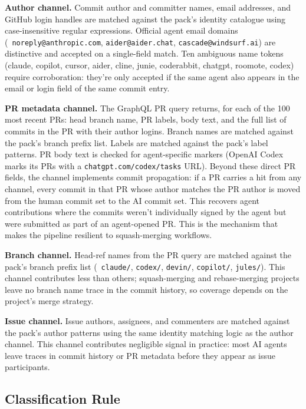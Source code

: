 \textbf{Author channel.} Commit author and committer names, email addresses, and GitHub login handles are matched against the pack's identity catalogue using case-insensitive regular expressions. Official agent email domains (\eg\ \texttt{noreply@anthropic.com}, \texttt{aider@aider.chat}, \texttt{cascade@windsurf.ai}) are distinctive and accepted on a single-field match. Ten ambiguous name tokens (claude, copilot, cursor, aider, cline, junie, coderabbit, chatgpt, roomote, codex) require corroboration: they're only accepted if the same agent also appears in the email or login field of the same commit entry.

\textbf{PR metadata channel.} The GraphQL PR query returns, for each of the 100 most recent PRs: head branch name, PR labels, body text, and the full list of commits in the PR with their author logins. Branch names are matched against the pack's branch prefix list. Labels are matched against the pack's label patterns. PR body text is checked for agent-specific markers (OpenAI Codex marks its PRs with a \texttt{chatgpt.com/codex/tasks} URL). Beyond these direct PR fields, the channel implements commit propagation: if a PR carries a hit from any channel, every commit in that PR whose author matches the PR author is moved from the human commit set to the AI commit set. This recovers agent contributions where the commits weren't individually signed by the agent but were submitted as part of an agent-opened PR. This is the mechanism that makes the pipeline resilient to squash-merging workflows.

\textbf{Branch channel.} Head-ref names from the PR query are matched against the pack's branch prefix list (\eg\ \texttt{claude/}, \texttt{codex/}, \texttt{devin/}, \texttt{copilot/}, \texttt{jules/}). This channel contributes less than others; squash-merging and rebase-merging projects leave no branch name trace in the commit history, so coverage depends on the project's merge strategy.

\textbf{Issue channel.} Issue authors, assignees, and commenters are matched against the pack's author patterns using the same identity matching logic as the author channel. This channel contributes negligible signal in practice: most AI agents leave traces in commit history or PR metadata before they appear as issue participants.

\subsection{Classification Rule}


